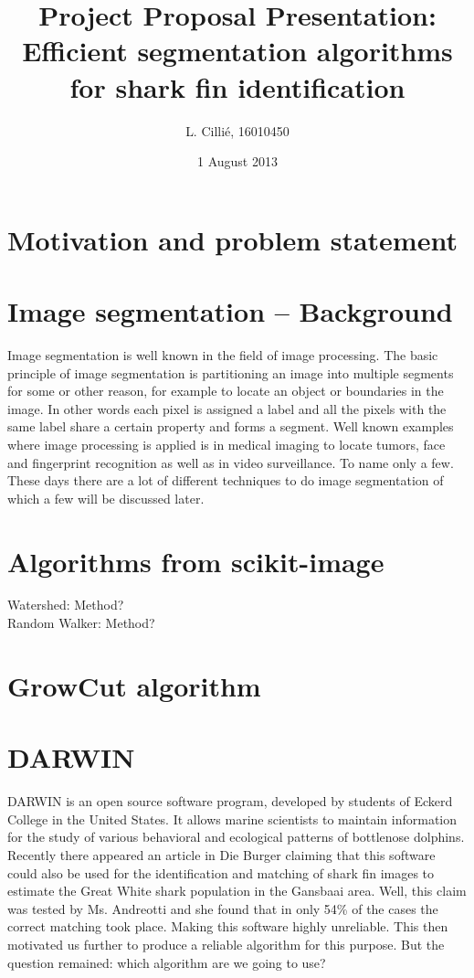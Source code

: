 \documentclass[a4paper,10pt]{article}
\title{Project Proposal Presentation: Efficient segmentation algorithms for shark fin identification}
\author{L. Cilli\'{e}, 16010450}
\date{1 August 2013}
\begin{document}
\maketitle
\section{Motivation and problem statement}


\section{Image segmentation -- Background}
Image segmentation is well known in the field of image processing.  The basic principle of image segmentation is partitioning an image into multiple segments for some or other reason, for example to locate an object or boundaries in the image.  In other words each pixel is assigned a label and all the pixels with the same label share a certain property and forms a segment.  Well known examples where image processing is applied is in medical imaging to locate tumors, face and fingerprint recognition as well as in video surveillance.  To name only a few.  These days there are a lot of different techniques to do image segmentation of which a few will be discussed later.


\section{Algorithms from scikit-image}
Watershed: Method?\\

Random Walker: Method?


\section{GrowCut algorithm}



\section{DARWIN}
DARWIN is an open source software program, developed by students of Eckerd College in the United States. It allows marine scientists to maintain information for the study of various behavioral and ecological patterns of bottlenose dolphins.  Recently there appeared an article in Die Burger claiming that this software could also be used for the identification and matching of shark fin images to estimate the Great White shark population in the Gansbaai area.  Well, this claim was tested by Ms. Andreotti and she found that in only 54\% of the cases the correct matching took place.  Making this software highly unreliable. This then motivated us further to produce a reliable algorithm for this purpose.  But the question remained: which algorithm are we going to use?
\end{document}
